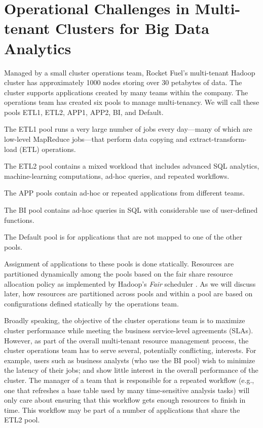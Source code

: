 

\section{Operational Challenges in Multi-tenant Clusters for Big Data
  Analytics}
\label{sec:sec2}

Managed by a small cluster operations team, Rocket Fuel's multi-tenant Hadoop cluster has approximately 1000 nodes storing over 30 petabytes of data. 
The cluster
supports applications created by many teams within the company.
The operations team has created six pools to manage
multi-tenancy. We will call these pools ETL1, ETL2, APP1, APP2, 
BI, and Default. 

\squishlist
\item The ETL1 pool runs a very large number of jobs every day---many of
which are low-level MapReduce jobs---that perform 
data copying and extract-transform-load (ETL) operations.
\item The ETL2 pool contains a mixed workload that includes advanced SQL
analytics, machine-learning computations, ad-hoc queries, and 
repeated workflows. 
\item The APP pools contain ad-hoc or repeated applications
from different teams. 
\item The BI pool contains ad-hoc queries in SQL with considerable 
use of user-defined functions. 
\item The Default pool is for applications that are not mapped
to one of the other pools. 
\squishend

\vspace{1mm}
\noindent Assignment of applications to these pools 
is done statically. Resources are partitioned dynamically 
among the pools based on the fair share resource allocation 
policy as implemented by Hadoop's {\em Fair} 
scheduler \cite{fair-share-scheduler}. 
 As we will discuss later, how resources are partitioned across pools 
and within a pool are based on configurations defined statically 
by the operations team.

Broadly speaking, the objective of the cluster operations team 
is to maximize cluster performance while meeting the business 
service-level agreements (SLAs). 
However, as part of the overall multi-tenant resource management process, 
the cluster operations team has to serve several, potentially
conflicting, interests. For example, users such as business 
analysts (who use the BI pool) wish to minimize the
latency of their jobs; and show little interest in the overall
performance of the cluster. The manager of a team that is 
responsible for a repeated workflow (e.g., one that 
refreshes a base table used by many time-sensitive analysis tasks)
will only care about ensuring that this workflow gets 
enough resources to finish in time. This workflow may be part
of a number of applications that share the ETL2 pool. 

